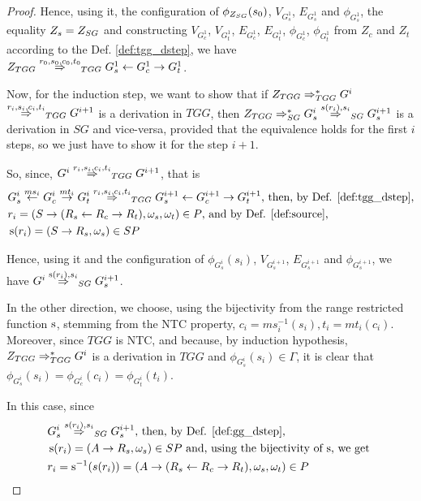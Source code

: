 \documentclass[runningheads]{llncs}
\begin{document}
\begin{proof}
	Hence, using it, the configuration of $\phi_{Z_{SG}}(s_0)$, $V_{G^1_s}$, $E_{G^1_s}$ and $\phi_{G^1_s}$, the equality $Z_s = Z_{SG}$ and constructing $V_{G^1_c}$, $V_{G^1_t}$, $E_{G^1_c}$, $E_{G^1_t}$, $\phi_{G^1_c}$, $\phi_{G^1_t}$ from $Z_c$ and $Z_t$ according to the Def. \ref{def:tgg_dstep}, we have $\startTG{TGG} \tderiv{r_0}{s_0,c_0,t_0}{TGG} G^1_s \ms{} G^1_c \mt{} G^1_t$.
	
	Now, for the induction step, we want to show that if $Z_{TGG} \Rightarrow^*_{TGG} G^i$ $\tderiv{r_{i}}{s_{i},c_{i},t_{i}}{TGG} G^{i+1}$ is a derivation in $TGG$, then $\startG{TGG} \derivtr{SG} G^i_s \deriv{s(r_{i})}{s_{i}}{SG} G^{i+1}_s$ is a derivation in $SG$ and vice-versa, provided that the equivalence holds for the first $i$ steps, so we just have to show it for the step $i+1$.
	
	So, since, $G^i \tderiv{r_{i}}{s_{i},c_{i},t_{i}}{TGG} G^{i+1}$, that is
	\begin{align*}
		& G^i_s \ms{ms_i} G^i_c \mt{mt_i} G^i_t \tderiv{r_i}{s_i,c_i,t_i}{TGG} G^{i+1}_s \ms{} G^{i+1}_c \mt{} G^{i+1}_t \text{, then, by Def. \ref{def:tgg_dstep},}\\
		& r_i = (S \pro (R_s \ms{} R_c \mt{} R_t), \omega_s, \omega_t) \in P \text{, and by Def. \ref{def:source},}\\
		& \source(r_i) = (S \pro R_s, \omega_s) \in SP
	\end{align*}
	
	Hence, using it and the configuration of $\phi_{G^i_s}(s_i)$, $V_{G^{i+1}_s}$, $E_{G^{i+1}_s}$ and $\phi_{G^{i+1}_s}$, we have $G^i \deriv{\source(r_i)}{s_i}{SG} G^{i+1}_s$.
	
	In the other direction, we choose, using the bijectivity from the range restricted function $\operatorname{s}$, stemming from the NTC property, $c_i = ms_i^{-1}(s_i), t_i = mt_i(c_i)$. Moreover, since $TGG$ is NTC, and because, by induction hypothesis, $Z_{TGG} \Rightarrow^*_{TGG} G^i$ is a derivation in $TGG$ and $\phi_{G^i_s}(s_i) \in \Gamma$, it is clear that $\phi_{G^i_s}(s_i) = \phi_{G^i_c}(c_i) = \phi_{G^i_t}(t_i)$.
	
	In this case, since
	\begin{align*}
		& G^{i}_s \deriv{s(r_i)}{s_i}{SG} G^{i+1}_s \text{, then, by Def. \ref{def:gg_dstep},}\\
		& \source(r_i) = (A \pro R_s, \omega_s) \in SP \text{ and, using the bijectivity of $\source$, we get }\\
		& r_i = \source^{-1}(s(r_i)) = (A \pro (R_s \ms{} R_c \mt{} R_t), \omega_s, \omega_t) \in P
	\end{align*} 
	

\end{proof}
\end{document}
